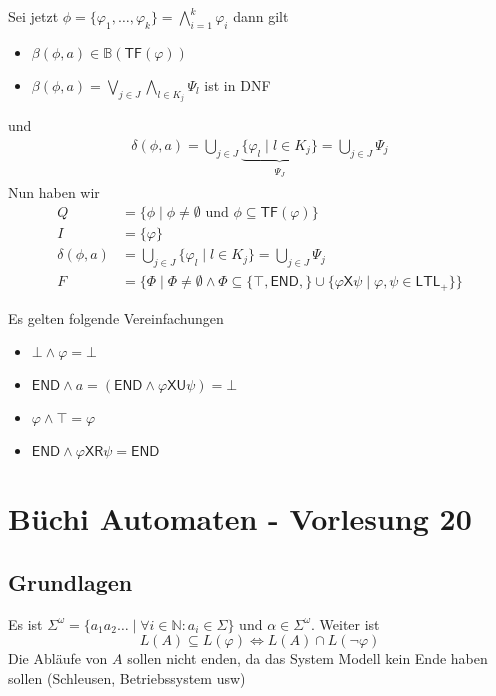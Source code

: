 \documentclass[12pt, german]{article}
\newcommand{\N}{\mathbb{N}}
\newcommand{\B}{\mathbb{B}}
\newcommand{\pom}{^{\omega}}
\newcommand{\ltl}{\mathsf{LTL}}
\newcommand{\sX}{\mathsf{X}}
\newcommand{\sU}{\mathsf{U}}
\newcommand{\sR}{\mathsf{R}}
\newcommand{\sende}{\mathsf{END}}
\newcommand{\tf}{\mathsf{TF}}
\begin{document}
Sei jetzt $\phi = \{\varphi_1, \ldots, \varphi_k\} = \bigwedge_{i = 1}^k \varphi_i$ dann gilt 
\begin{itemize}
	\item$\beta(\phi, a) \in \B(\tf(\varphi))$
	\item $\beta(\phi, a) = \bigvee_{j \in J} \bigwedge_{l \in K_j}\Psi_l$ ist in DNF
\end{itemize} und 
\begin{align*}
	\delta(\phi, a) = \bigcup_{j \in J} \underbrace{\{\varphi_l \mid l \in K_j\} }_{\substack{\Psi_J}}= \bigcup_{j\in J} \Psi_j
\end{align*}
	Nun haben wir 
	\begin{align*}
		Q &= \{\phi \mid \phi \not = \emptyset \text{ und } \phi \subseteq \tf(\varphi)\} \\
		I &= \{\varphi\} \\
		\delta(\phi, a) &= \bigcup_{j \in J} \{\varphi_l \mid l \in K_j\} = \bigcup_{j\in J} \Psi_j \\
		F &= \{\Phi \mid \Phi \not = \emptyset \land \Phi \subseteq \{\top, \sende, \} \cup \{\varphi\sX\psi \mid \varphi, \psi \in \ltl_+\}\}
	\end{align*}
	\newline
	
	Es gelten folgende Vereinfachungen
	\begin{itemize}
		\item $\bot \land \varphi = \bot$
		\item $\sende \land a = (\sende \land \varphi\sX\sU\psi) = \bot$
		\item $\varphi \land \top = \varphi$
		\item $\sende \land \varphi \sX\sR\psi = \sende$
	\end{itemize}
	
\section{Büchi Automaten - Vorlesung 20}
\subsection{Grundlagen}
 Es ist $\Sigma\pom = \{a_1a_2\ldots \mid \forall i \in \N: a_i \in \Sigma \}$ und $\alpha \in \Sigma\pom$. Weiter ist $$L(A) \subseteq L(\varphi) \iff L(A) \cap L(\neg \varphi)$$
 Die Abläufe von $A$ sollen nicht enden, da das System Modell kein Ende haben sollen (Schleusen, Betriebssystem usw)
\end{document}

